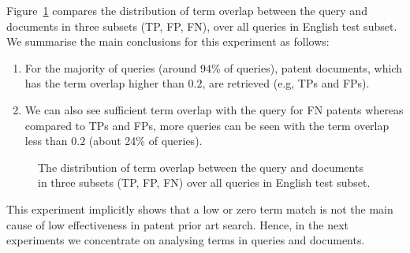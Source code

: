 Figure~\ref{fig:overlap} compares the distribution of term overlap between the query and documents in three subsets (TP, FP, FN), over all queries in English test subset. We summarise the main conclusions for this experiment as follows:
\begin{enumerate}
\item For the majority of queries (around 94\% of queries), patent documents, which has the term overlap higher than $0.2$, are retrieved (e.g, TPs and FPs). 
\item We can also see sufficient term overlap with the query for FN patents whereas compared to TPs and FPs, more queries can be seen with the term overlap less than $ 0.2 $ (about 24\% of queries). 
\end{enumerate}
\begin{figure}[t!]
\begin{centering}
\par\end{centering}

\protect\caption{The distribution of term overlap between the query and documents in three subsets (TP, FP, FN) over all queries in English test subset.}
\label{fig:overlap}
\end{figure}
This experiment implicitly shows that a low or zero term match is not the main cause of low effectiveness in patent prior art search. Hence, in the next experiments we concentrate on analysing terms in queries and documents.
